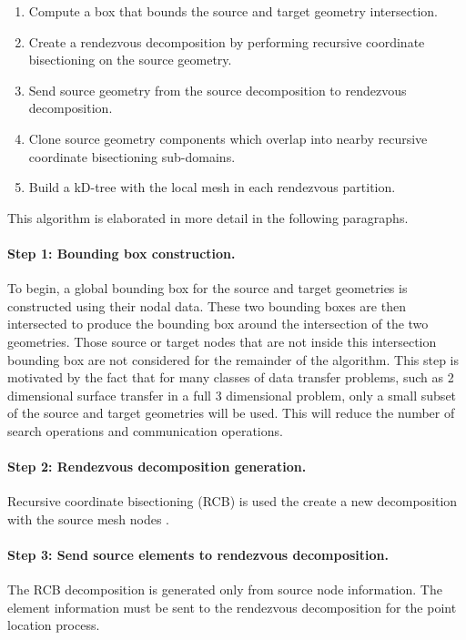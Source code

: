 \documentclass[letterpaper,12pt]{article}
\begin{document}
\begin{enumerate}
\item Compute a box that bounds the source and target geometry
  intersection.
\item Create a rendezvous decomposition by performing recursive
  coordinate bisectioning on the source geometry.
\item Send source geometry from the source decomposition to rendezvous
  decomposition.
\item Clone source geometry components which overlap into nearby
  recursive coordinate bisectioning sub-domains.
\item Build a kD-tree with the local mesh in each rendezvous
  partition.
\end{enumerate}

This algorithm is elaborated in more detail in the following
paragraphs.

\paragraph{Step 1: Bounding box construction.}
To begin, a global bounding box for the source and target geometries
is constructed using their nodal data. These two bounding boxes are
then intersected to produce the bounding box around the intersection
of the two geometries. Those source or target nodes that are not
inside this intersection bounding box are not considered for the
remainder of the algorithm. This step is motivated by the fact that
for many classes of data transfer problems, such as 2 dimensional
surface transfer in a full 3 dimensional problem, only a small subset
of the source and target geometries will be used. This will reduce the
number of search operations and communication operations.

\paragraph{Step 2: Rendezvous decomposition generation.}
Recursive coordinate bisectioning (RCB) is used the create a new
decomposition with the source mesh nodes \cite{Berger_1987}.

\paragraph{Step 3: Send source elements to rendezvous decomposition.}
The RCB decomposition is generated only from source node
information. The element information must be sent to the rendezvous
decomposition for the point location process. 
\end{document}
